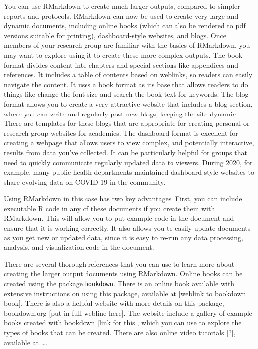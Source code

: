 \documentclass[]{tufte-book}
\begin{document}
You can use RMarkdown to create much larger outputs, compared to simpler reports
and protocols. RMarkdown can now be used to create very large and dynamic documents,
including online books (which can also be rendered to pdf versions suitable for
printing), dashboard-style websites, and blogs. Once members of your research
group are familiar with the basics of RMarkdown, you may want to explore using
it to create these more complex outputs. The book format divides content into
chapters and special sections like appendices and references. It includes a
table of contents based on weblinks, so readers can easily navigate the content.
It uses a book format as its base that allows readers to do things like change the
font size and search the book text for keywords. The blog format allows you to
create a very attractive website that includes a blog section, where you can
write and regularly post new blogs, keeping the site dynamic. There are templates
for these blogs that are appropriate for creating personal or research group
websites for academics. The dashboard format is excellent for creating a webpage
that allows users to view complex, and potentially interactive, results from
data you've collected. It can be particularly helpful for groups that need to
quickly communicate regularly updated data to viewers. During 2020, for example,
many public health departments maintained dashboard-style websites to share
evolving data on COVID-19 in the community.

Using RMarkdown in this case has two key advantages. First, you can include
executable R code in any of these documents if you create them with RMarkdown.
This will allow you to put example code in the document and ensure that it is
working correctly. It also allows you to easily update documents as you get new
or updated data, since it is easy to re-run any data processing, analysis, and
visualization code in the document.

There are several thorough references that you can use to learn more about creating
the larger output documents using RMarkdown. Online books can be created using the
package \texttt{bookdown}. There is an online book available with extensive instructions on
using this package, available at {[}weblink to bookdown book{]}. There is also a helpful
website with more details on this package, bookdown.org {[}put in full webline here{]}.
The website include a gallery of example books created with bookdown {[}link for this{]},
which you can use to explore the types of books that can be created. There are also
online video tutorials {[}?{]}, available at \ldots.
\end{document}
